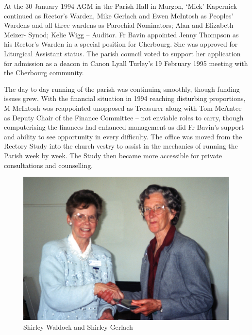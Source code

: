 At the 30 January 1994 AGM in the Parish Hall in Murgon, `Mick' Kapernick continued as Rector's Warden, Mike Gerlach and Ewen McIntosh as Peoples' Wardens and all three wardens as Parochial Nominators; Alan and Elizabeth Meizer- Synod; Kelie Wigg -- Auditor. Fr Bavin appointed Jenny Thompson as his Rector's Warden in a special position for Cherbourg. She was approved for Liturgical Assistant status. The parish council voted to support her application for admission as a deacon in Canon Lyall Turley's 19 February 1995 meeting with the Cherbourg community.



The day to day running of the parish was continuing smoothly, though funding issues grew. With the financial situation in 1994 reaching disturbing proportions, M McIntosh was reappointed unopposed as Treasurer along with Tom McAntee as Deputy Chair of the Finance Committee -- not enviable roles to carry, though computerising the finances had enhanced management as did Fr Bavin's support and ability to see opportunity in every difficulty. The office was moved from the Rectory Study into the church vestry to assist in the mechanics of running the Parish week by week. The Study then became more accessible for private consultations and counselling.









\begin{figure}
\begin{center}
\includegraphics[width=1.\linewidth,center]{../images/waldockGerlach.jpg}
\caption{Shirley Waldock and Shirley Gerlach}
\end{center}
\end{figure}




